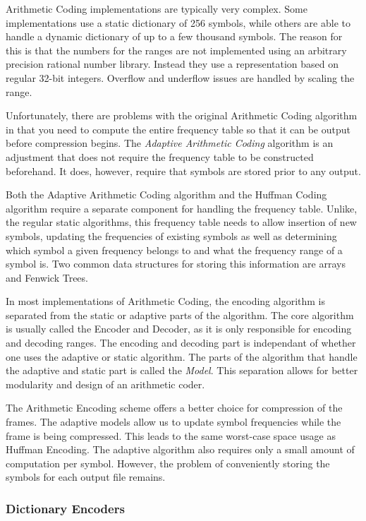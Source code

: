 \documentclass[a4paper,11pt]{report}
\begin{document}
Arithmetic Coding implementations are typically very complex. Some implementations use a static dictionary of 256 symbols, while others are able to handle a dynamic dictionary of up to a few thousand symbols. The reason for this is that the numbers for the ranges are not implemented using an arbitrary precision rational number library. Instead they use a representation based on regular 32-bit integers. Overflow and underflow issues are handled by scaling the range.

Unfortunately, there are problems with the original Arithmetic Coding algorithm in that you need to compute the entire frequency table so that it can be output before compression begins. The \emph{Adaptive Arithmetic Coding} algorithm is an adjustment that does not require the frequency table to be constructed beforehand. It does, however, require that symbols are stored prior to any output. 

Both the Adaptive Arithmetic Coding algorithm and the Huffman Coding algorithm require a separate component for handling the frequency table. Unlike, the regular static algorithms, this frequency table needs to allow insertion of new symbols, updating the frequencies of existing symbols as well as determining which symbol a given frequency belongs to and what the frequency range of a symbol is. Two common data structures for storing this information are arrays and Fenwick Trees\cite{fenwick1994new}.

In most implementations of Arithmetic Coding, the encoding algorithm is separated from the static or adaptive parts of the algorithm. The core algorithm is usually called the Encoder and Decoder, as it is only responsible for encoding and decoding ranges. The encoding and decoding part is independant of whether one uses the adaptive or static algorithm. The parts of the algorithm that handle the adaptive and static part is called the \emph{Model}. This separation allows for better modularity and design of an arithmetic coder.

The Arithmetic Encoding scheme offers a better choice for compression of the frames. The adaptive models allow us to update symbol frequencies while the frame is being compressed. This leads to the same worst-case space usage as Huffman Encoding. The adaptive algorithm also requires only a small amount of computation per symbol. However, the problem of conveniently storing the symbols for each output file remains.

\subsubsection{Dictionary Encoders}
\end{document}
